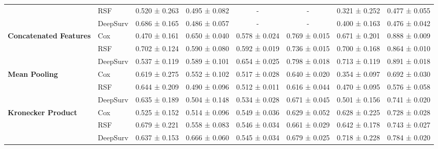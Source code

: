 \begin{sidewaystable}[htbp]
\begin{tabular}{@{}llcccccc@{}}
        & RSF & 0.520 ± 0.263 & 0.495 ± 0.082 & - & - & 0.321 ± 0.252 & 0.477 ± 0.055 \\
        & DeepSurv & 0.686 ± 0.165 & 0.486 ± 0.057 & - & - & 0.400 ± 0.163 & 0.476 ± 0.042 \\
        \midrule
        \multirow{3}{*}{\textbf{Concatenated Features}} & Cox & 0.470 ± 0.161 & 0.650 ± 0.040 & 0.578 ± 0.024 & 0.769 ± 0.015 & 0.671 ± 0.201 & 0.888 ± 0.009 \\
        & RSF & 0.702 ± 0.124 & 0.590 ± 0.080 & 0.592 ± 0.019 & 0.736 ± 0.015 & 0.700 ± 0.168 & 0.864 ± 0.010 \\
        & DeepSurv & 0.537 ± 0.119 & 0.589 ± 0.101 & 0.654 ± 0.025 & 0.798 ± 0.018 & 0.713 ± 0.119 & 0.891 ± 0.018 \\
        \midrule
        \multirow{3}{*}{\textbf{Mean Pooling}} & Cox & 0.619 ± 0.275 & 0.552 ± 0.102 & 0.517 ± 0.028 & 0.640 ± 0.020 & 0.354 ± 0.097 & 0.692 ± 0.030 \\
        & RSF & 0.644 ± 0.209 & 0.490 ± 0.096 & 0.512 ± 0.011 & 0.616 ± 0.044 & 0.470 ± 0.095 & 0.576 ± 0.058 \\
        & DeepSurv & 0.635 ± 0.189 & 0.504 ± 0.148 & 0.534 ± 0.028 & 0.671 ± 0.045 & 0.501 ± 0.156 & 0.741 ± 0.020 \\
        \midrule
        \multirow{3}{*}{\textbf{Kronecker Product}} & Cox & 0.525 ± 0.152 & 0.514 ± 0.096 & 0.549 ± 0.036 & 0.629 ± 0.052 & 0.628 ± 0.225 & 0.728 ± 0.028 \\
        & RSF & 0.679 ± 0.221 & 0.558 ± 0.083 & 0.546 ± 0.034 & 0.661 ± 0.029 & 0.642 ± 0.178 & 0.743 ± 0.027 \\
        & DeepSurv & 0.637 ± 0.153 & 0.666 ± 0.060 & 0.545 ± 0.034 & 0.679 ± 0.025 & 0.718 ± 0.228 & 0.784 ± 0.020 \\
        \bottomrule
    \end{tabular}
\end{sidewaystable}

